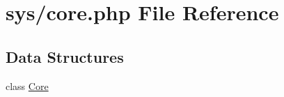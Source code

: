 \hypertarget{core_8php}{}\section{sys/core.php File Reference}
\label{core_8php}
\subsection*{Data Structures}
\begin{DoxyCompactItemize}
\item 
class \hyperlink{classCore}{Core}
\end{DoxyCompactItemize}

